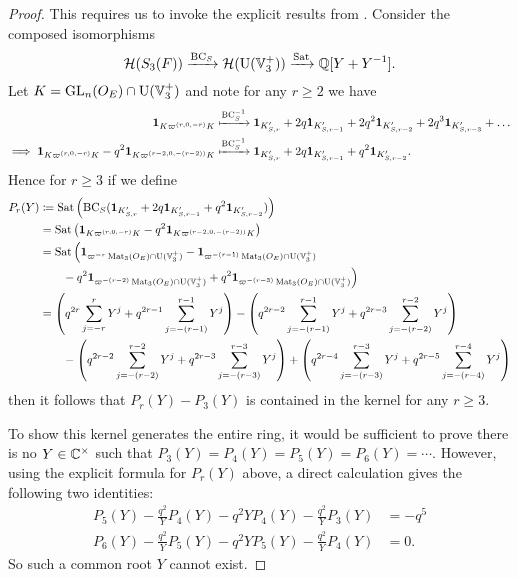 \begin{proof}
  This requires us to invoke the explicit results from .
  Consider the composed isomorphisms
  \[ \mathcal H(S_3(F)) \xrightarrow{\operatorname{BC}_S} \mathcal H(\operatorname{U}(\mathbb V_3^+)) \xrightarrow{\operatorname{Sat}} \mathbb Q[Y + Y^{-1}]. \]
  Let $K =  \operatorname{GL}_n(O_E) \cap \operatorname{U}(\mathbb V_3^+)$ and note for any $r \ge 2$ we have
  \begin{align*}
    \mathbf{1}_{K\varpi^{(r,0,-r)}K}
    &\xmapsto{\operatorname{BC}_S^{-1}}
    \mathbf{1}_{K'_{S, r}} + 2q \mathbf{1}_{K'_{S, r-1}} + 2q^2 \mathbf{1}_{K'_{S, r-2}} + 2q^3 \mathbf{1}_{K'_{S, r-3}} + \dots \\
    \implies
    \mathbf{1}_{K\varpi^{(r,0,-r)}K} - q^2 \mathbf{1}_{K\varpi^{(r-2,0,-(r-2))}K}
    &\xmapsto{\operatorname{BC}_S^{-1}}
    \mathbf{1}_{K'_{S, r}} + 2q \mathbf{1}_{K'_{S, r-1}} + q^2 \mathbf{1}_{K'_{S, r-2}}.
  \end{align*}
  Hence for $r \ge 3$ if we define
  \begin{align*}
    P_r(Y) &\coloneqq \operatorname{Sat}\left(\operatorname{BC}_S(\mathbf{1}_{K'_{S, r}}
      + 2q \mathbf{1}_{K'_{S, r-1}} + q^2 \mathbf{1}_{K'_{S, r-2}})\right) \\
    &= \operatorname{Sat}\left( \mathbf{1}_{K\varpi^{(r,0,-r)}K} - q^2 \mathbf{1}_{K\varpi^{(r-2,0,-(r-2))}K} \right) \\
    &= \operatorname{Sat}\Big(
      \mathbf{1}_{\varpi^{-r} \operatorname{Mat}_3(O_E) \cap \operatorname{U}(\mathbb V_3^+)}
      - \mathbf{1}_{\varpi^{-(r-1)} \operatorname{Mat}_3(O_E) \cap \operatorname{U}(\mathbb V_3^+)} \\
      &\qquad- q^2 \mathbf{1}_{\varpi^{-(r-2)} \operatorname{Mat}_3(O_E) \cap \operatorname{U}(\mathbb V_3^+)}
      + q^2 \mathbf{1}_{\varpi^{-(r-3)} \operatorname{Mat}_3(O_E) \cap \operatorname{U}(\mathbb V_3^+)}
      \Big) \\
    &= \left( q^{2r} \sum_{j=-r}^r Y^j + q^{2r-1} \sum_{j=-(r-1)}^{r-1} Y^j \right)
    - \left( q^{2r-2} \sum_{j=-(r-1)}^{r-1} Y^j + q^{2r-3} \sum_{j=-(r-2)}^{r-2} Y^j \right) \\
    &\qquad- \left( q^{2r-2} \sum_{j=-(r-2)}^{r-2} Y^j + q^{2r-3} \sum_{j=-(r-3)}^{r-3} Y^j \right)
    + \left( q^{2r-4} \sum_{j=-(r-3)}^{r-3} Y^j + q^{2r-5} \sum_{j=-(r-4)}^{r-4} Y^j \right)
  \end{align*}
  then it follows that $P_r(Y) - P_3(Y)$ is contained in the kernel for any $r \ge 3$.

  To show this kernel generates the entire ring, it would be sufficient to prove
  there is no $Y \in \mathbb C^\times$ such that $P_3(Y) = P_4(Y) = P_5(Y) = P_6(Y) = \dotsb$.
  However, using the explicit formula for $P_r(Y)$ above,
  a direct calculation gives the following two identities:
  \begin{align*}
    P_5(Y) - \frac{q^2}{Y} P_4(Y) - q^2 Y P_4(Y) - \frac{q^2}{Y} P_3(Y) &= -q^5 \\
    P_6(Y) - \frac{q^2}{Y} P_5(Y) - q^2 Y P_5(Y) - \frac{q^2}{Y} P_4(Y) &= 0.
  \end{align*}
  So such a common root $Y$ cannot exist.
\end{proof}
